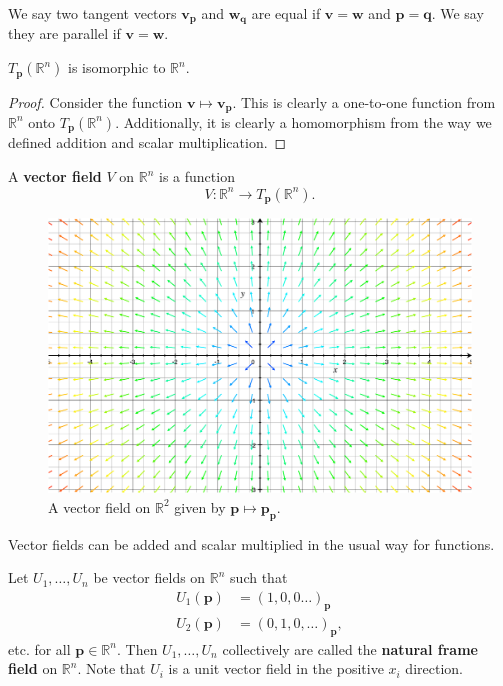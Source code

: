 \documentclass[10pt]{report}
\begin{document}
We say two tangent vectors $\mathbf{v}_\mathbf{p}$ and $\mathbf{w}_{\mathbf{q}}$ are equal if $\mathbf{v}=\mathbf{w}$ and $\mathbf{p}=\mathbf{q}$. We say they are parallel if $\mathbf{v}=\mathbf{w}$.

\begin{prop}
	$T_\mathbf{p}(\mathbb{R}^n)$ is isomorphic to $\mathbb{R}^n$.
\end{prop}
\begin{proof}
	Consider the function $\mathbf{v} \mapsto \mathbf{v}_\mathbf{p}$. This is clearly a one-to-one function from $\mathbb{R}^n$ onto $T_\mathbf{p}(\mathbb{R}^n)$. Additionally, it is clearly a homomorphism from the way we defined addition and scalar multiplication.
\end{proof}

\begin{defn}
	A \textbf{vector field} $V$ on $\mathbb{R}^n$ is a function
	\[
		V:\mathbb{R}^n \to T_{\mathbf{p}}(\mathbb{R}^n).
	\] 
\end{defn}

\begin{figure}[H]
	\centering
	\includegraphics[scale=0.3]{fig/vec-field.pdf}
	\caption{A vector field on $\mathbb{R}^2$ given by $\mathbf{p}\mapsto \mathbf{p}_{\mathbf{p}}.$}
\end{figure}

Vector fields can be added and scalar multiplied in the usual way for functions.

Let $U_1, \dots, U_n$ be vector fields on $\mathbb{R}^n$ such that
\begin{align*}
	U_1(\mathbf{p}) &= (1, 0, 0 \dots)_\mathbf{p} \\
	U_2(\mathbf{p}) &= (0, 1, 0, \dots)_\mathbf{p},
\end{align*} etc. for all $\mathbf{p} \in \mathbb{R}^n$. Then $U_1, \dots, U_n$ collectively are called the \textbf{natural frame field} on $\mathbb{R}^n$. Note that $U_i$ is a unit vector field in the positive $x_i$ direction.
\end{document}
